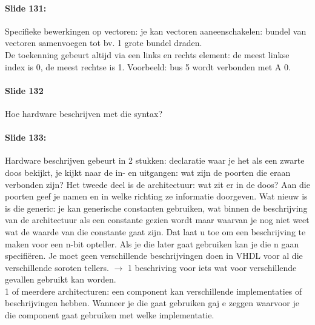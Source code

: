 \documentclass[10pt,a4paper]{book}
\begin{document}
\paragraph{Slide 131:} Specifieke bewerkingen op vectoren: je kan vectoren aaneenschakelen: bundel van vectoren samenvoegen tot bv. 1 grote bundel draden.\\
De toekenning gebeurt altijd via een links en rechts element: de meest linkse index is 0, de meest rechtse is 1. Voorbeeld: bus 5 wordt verbonden met A 0.

\paragraph{Slide 132} Hoe hardware beschrijven met die syntax? 

\paragraph{Slide 133:} Hardware beschrijven gebeurt in 2 stukken: declaratie waar je het als een zwarte doos bekijkt, je kijkt naar de in- en uitgangen: wat zijn de poorten die eraan verbonden zijn? Het tweede deel is de architectuur: wat zit er in de doos? Aan die poorten geef je namen en in welke richting ze informatie doorgeven. Wat nieuw is is die generic: je kan generische constanten gebruiken, wat binnen de beschrijving van de architectuur als een constante gezien wordt maar waarvan je nog niet weet wat de waarde van die constante gaat zijn. Dat laat u toe om een beschrijving te maken voor een n-bit opteller. Als je die later gaat gebruiken kan je die n gaan specifi\"eren. Je moet geen verschillende beschrijvingen doen in VHDL voor al die verschillende soroten tellers. $\rightarrow$ 1 beschriving voor iets wat voor verschillende gevallen gebruikt kan worden.\\
1 of meerdere architecturen: een component kan verschillende implementaties of beschrijvingen hebben. Wanneer je die gaat gebruiken gaj e zeggen waarvoor je die component gaat gebruiken met welke implementatie.
\end{document}
